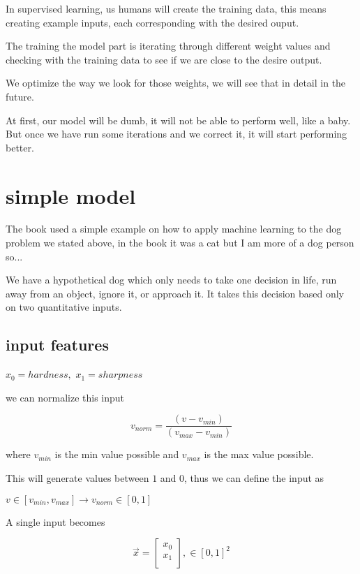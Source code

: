 \documentclass[twocolumn]{article}
\begin{document}
In supervised learning, us humans will create the training data, this means
creating example inputs, each corresponding with the desired ouput.

The training the model part is iterating through different weight values and
checking with the training data to see if we are close to the desire output.

We optimize the way we look for those weights, we will see that in detail in
the future. 

At first, our model will be dumb, it will not be able to perform well, like a
baby. But once we have run some iterations and we correct it, it will start
performing better.

\section{simple model}

The book used a simple example on how to apply machine learning to the dog
problem we stated above, in the book it was a cat but I am more of a dog person
so...

We have a hypothetical dog which only needs to take one decision in life, run
away from an object, ignore it, or approach it. It takes this decision based
only on two quantitative inputs.

\subsection{input features}

{$ \displaystyle x_0 = hardness,$}
{$ x_1 = sharpness $}

we can normalize this input

\begin{equation}
v_{norm} = \dfrac{(v - v_{min})}{(v_{max} - v_{min})}
\end{equation}

where {$v_{min}$} is the min value possible and {$v_{max}$} is the max value
possible.

This will generate values between $1$ and $0$, thus we can define the input as 

{$ v \in [v_{min}, v_{max}] \rightarrow v_{norm} \in [0, 1] $} 

A single input becomes

\begin{equation}
    \vec{x} = \begin{bmatrix}
                x_0 \\
                x_1 \\
              \end{bmatrix}, 
              \in [0, 1]^2
\end{equation}
\end{document}
